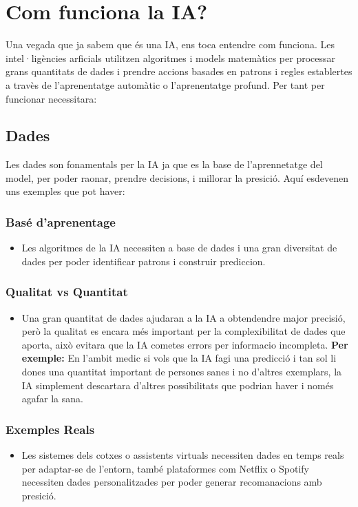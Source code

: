 \section{Com funciona la IA?}
Una vegada que ja sabem que és una IA, ens toca entendre com funciona. Les intel·ligències arficials utilitzen algoritmes i models matemàtics per processar grans quantitats de dades i prendre accions basades en patrons i regles establertes a travès de l'aprenentatge automàtic o l'aprenentatge profund. Per tant per funcionar necessitara:    \   \  \  \   \ 

\subsection{Dades}\label{subsec:Dades}
Les dades son fonamentals per la IA ja que es la base de l'aprennetatge del model, per poder raonar, prendre decisions, i millorar la presició. Aquí esdevenen uns exemples que pot haver:

\subsubsection{Basé d'aprenentage}
\begin{itemize}
 \item Les algoritmes de la IA necessiten a base de dades i una gran diversitat de dades per poder identificar patrons i construir prediccion.
\end{itemize}
\subsubsection{Qualitat vs Quantitat}
\begin{itemize}
\item Una gran quantitat de dades ajudaran a la IA a obtendendre major precisió, però la qualitat es encara més important per la complexibilitat de dades que aporta, això evitara que la IA cometes errors per informacio incompleta.\textbf{ Per exemple:} {\color{blue}En l'ambit medic si vols que la IA fagi una predicció i tan sol li dones una quantitat important de persones sanes i no d'altres exemplars, la IA simplement descartara d'altres possibilitats que podrian haver i només agafar la sana.}
\end{itemize}
\subsubsection{Exemples Reals}
\begin{itemize}
 \item Les sistemes dels cotxes o assistents virtuals necessiten dades en temps reals per adaptar-se de l'entorn, també plataformes com Netflix o Spotify necessiten dades personalitzades per poder generar recomanacions amb presició.
\end{itemize}
